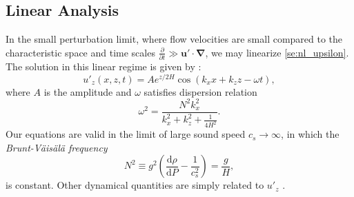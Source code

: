\documentclass[
        fleqn,
        usenatbib,
    ]{mnras}
\newcommand*{\rd}[2]{\frac{\mathrm{d}#1}{\mathrm{d}#2}}
\newcommand*{\pd}[2]{\frac{\partial#1}{\partial#2}}
\newcommand*{\p}[1]{\left(#1\right)}
\newcommand*{\bm}[1]{\boldsymbol{\mathbf{#1}}}
\begin{document}
\subsection{Linear Analysis}

In the small perturbation limit, where flow velocities are small compared to the
characteristic space and time scales $\pd{}{t} \gg \bm{u}' \cdot
\bm{\nabla}$, we may linearize \autoref{se:nl_upsilon}. The solution in this
linear regime is given by \citep{drazin,sutherland0}:
\begin{equation}
    u'_z\p{x, z, t} = Ae^{z/2H}\cos\p{k_{x}x + k_{z}z - \omega t},
        \label{eq:k0z_sign}
\end{equation}
where $A$ is the amplitude and $\omega$ satisfies dispersion relation
\begin{equation}
    \omega^2 = \frac{N^2k_{x}^2}{k_{x}^2 + k_{z}^2 + \frac{1}{4H^2}}.
        \label{eq:disp_rel}
\end{equation}
Our equations are valid in the limit of large sound speed $c_s \to \infty$, in
which the \emph{Brunt-V\"ais\"al\"a frequency}
\begin{equation}
    N^2 \equiv g^2\p{\rd{\rho}{P} - \frac{1}{c_s^2}} = \frac{g}{H},
\end{equation}
is constant. Other dynamical quantities are simply related to $u'_z$ \citep[see
e.g.][]{sutherland0}.
\end{document}
